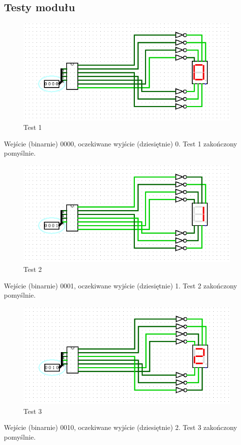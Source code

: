 \subsection{Testy modułu}\label{subsec:module-tests}
\begin{figure}[h]
    \includegraphics[width=\linewidth]{logisim_screenshots/0.png}
    \caption{Test 1}
    \label{fig:test0}
\end{figure}
Wejście (binarnie) 0000, oczekiwane wyjście (dziesiętnie) 0.\newline
Test 1 zakończony pomyślnie.

\begin{figure}[H]
    \includegraphics[width=\linewidth]{logisim_screenshots/1.png}
    \caption{Test 2}
    \label{fig:test1}
\end{figure}
Wejście (binarnie) 0001, oczekiwane wyjście (dziesiętnie) 1.\newline
Test 2 zakończony pomyślnie.

\begin{figure}[H]
    \includegraphics[width=\linewidth]{logisim_screenshots/2.png}
    \caption{Test 3}
    \label{fig:test2}
\end{figure}
Wejście (binarnie) 0010, oczekiwane wyjście (dziesiętnie) 2.\newline
Test 3 zakończony pomyślnie.

